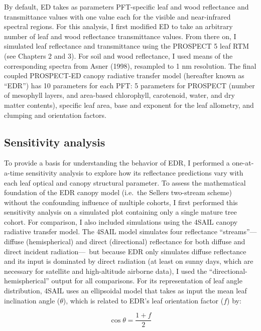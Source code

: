By default, ED takes as parameters PFT-specific leaf and wood reflectance and transmittance values with one value each for the visible and near-infrared spectral regions. 
For this analysis, I first modified ED to take an arbitrary number of leaf and wood reflectance transmittance values.
From there on, I simulated leaf reflectance and transmittance using the PROSPECT 5 leaf RTM (see Chapters 2 and 3).
For soil and wood reflectance, I used means of the corresponding spectra from Asner (1998), resampled to 1 nm resolution. \nocite{asner_1998_biophysical}
The final coupled PROSPECT-ED canopy radiative transfer model (hereafter known as ``EDR'') has 10 parameters for each PFT\@:
5 parameters for PROSPECT (number of mesophyll layers, and area-based chlorophyll, carotenoid, water, and dry matter contents),
specific leaf area,
base and exponent for the leaf allometry,
and clumping and orientation factors.

\subsection{Sensitivity analysis}

To provide a basis for understanding the behavior of EDR, I performed a one-at-a-time sensitivity analysis to explore how its reflectance predictions vary with each leaf optical and canopy structural parameter.
To assess the mathematical foundation of the EDR canopy model (i.e.\ the Sellers two-stream scheme) without the confounding influence of multiple cohorts, I first performed this sensitivity analysis on a simulated plot containing only a single mature tree cohort.
For comparison, I also included simulations using the 4SAIL canopy radiative transfer model.
The 4SAIL model simulates four reflectance ``streams''---diffuse (hemispherical) and direct (directional) reflectance for both diffuse and direct incident radiation---\
but because EDR only simulates diffuse reflectance and its input is dominated by direct radiation (at least on sunny days, which are necessary for satellite and high-altitude airborne data), I used the ``directional-hemispherical'' output for all comparisons.
For its representation of leaf angle distribution, 4SAIL uses an ellipsoidal model that takes as input the mean leaf inclination angle ($\theta$), which is related to EDR's leaf orientation factor ($f$) by:

\begin{equation}\label{eq:orient_lidf}
  \cos \theta = \frac{1 + f}{2}
\end{equation}

